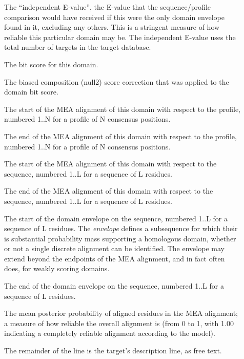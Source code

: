 \begin{description}
\item[] The ``independent E-value'', the
  E-value that the sequence/profile comparison would have received if
  this were the only domain envelope found in it, excluding any
  others. This is a stringent measure of how reliable this particular
  domain may be. The independent E-value uses the total number of
  targets in the target database.

\item[] The bit score for this domain.

\item[] The biased composition (null2) score
  correction that was applied to the domain bit score.

\item[]
  The start of the MEA alignment of this domain with respect to the
  profile, numbered 1..N for a profile of N consensus positions.

\item[]
  The end of the MEA alignment of this domain with respect to the
  profile, numbered 1..N for a profile of N consensus positions.

\item[]
  The start of the MEA alignment of this domain with respect to the
  sequence, numbered 1..L for a sequence of L residues.
 
\item[]
  The end of the MEA alignment of this domain with respect to the
  sequence, numbered 1..L for a sequence of L residues.

\item[] The start of the domain
  envelope on the sequence, numbered 1..L for a sequence of L
  residues. The \emph{envelope} defines a subsequence for which their
  is substantial probability mass supporting a homologous domain, 
  whether or not a single discrete alignment can be identified. 
  The envelope may extend beyond the endpoints of the MEA alignment,
  and in fact often does, for weakly scoring domains.

\item[] The end of the domain
  envelope on the sequence, numbered 1..L for a sequence of L
  residues. 

\item[] The mean posterior probability of aligned
  residues in the MEA alignment; a measure of how reliable the overall
  alignment is (from 0 to 1, with 1.00 indicating a completely
  reliable alignment according to the model).

\item[] The remainder of the line
  is the target's description line, as free text.
\end{description}

